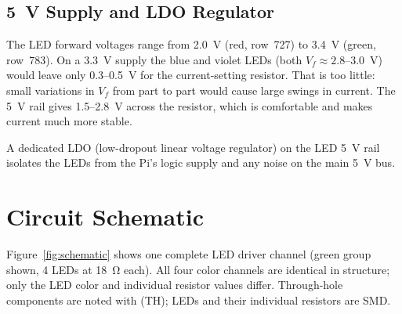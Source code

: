 \documentclass[12pt,letterpaper]{article}
\begin{document}
\subsection{5~V Supply and LDO Regulator}

The LED forward voltages range from 2.0~V (red, row~727) to 3.4~V (green, row~783).
On a 3.3~V supply the blue and violet LEDs (both $V_f \approx 2.8$--3.0~V) would leave
only 0.3--0.5~V for the current-setting resistor. That is too little: small variations
in $V_f$ from part to part would cause large swings in current. The 5~V rail gives
1.5--2.8~V across the resistor, which is comfortable and makes current much more stable.

A dedicated LDO (low-dropout linear voltage regulator) on the LED 5~V rail isolates
the LEDs from the Pi's logic supply and any noise on the main 5~V bus.

\section{Circuit Schematic}

Figure~\ref{fig:schematic} shows one complete LED driver channel (green group shown,
4 LEDs at 18~\si{\ohm} each). All four color channels are identical in structure; only
the LED color and individual resistor values differ. Through-hole components are noted
with (TH); LEDs and their individual resistors are SMD.
\end{document}
